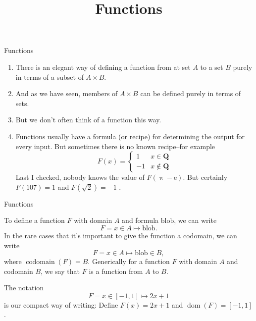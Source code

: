 \documentclass[fleqn]{beamer}
\title{\textbf{Functions}}
\date{}
\newcommand{\rationals}{\mathbf{Q}}
\DeclareMathOperator{\dom}{dom}
\DeclareMathOperator{\codomain}{codomain}
\theoremstyle{definition}
\newenvironment{checklist}{
  \begin{enumerate}[\ding{51}]
    \addtolength{\itemsep}{-0.0\itemsep}}
  {\end{enumerate}}
\begin{document}
\frame{\titlepage}


\begin{frame}{Functions}

\begin{checklist}

\item There is an elegant way of defining a function from at set \(A\) to a set \(B\)
  purely in terms of a subset of \(A \times B\).

\vspace{0.2in}

\item And as we have seen, members of \(A \times B\) can be defined purely in terms 
of sets.

\vspace{0.2in}

\item But we don't often think of a function this way.

\vspace{0.2in}

\item Functions usually have a formula (or recipe) for determining the output for 
every input. But sometimes there is no known recipe--for example
\[
    F(x) = \begin{cases}   1   & x \in \rationals \\   -1   & x \notin \rationals  \end{cases}
 \]
 Last I checked, nobody knows the value of \(F(\uppi - \mathrm{e}) \).    
 But certainly \(F(107) = 1 \) and  \(F(\sqrt{2}) = -1 \) .
     

\end{checklist}

\end{frame}

\begin{frame}{Functions}

To define a function \(F\) with domain \(A\) and formula \(\mbox{blob}\), we can 
write
\[
  F = x \in A \mapsto \mbox{blob}.
\]
In the rare cases that it's important to give the function a codomain, we can write
\[
  F = x \in A \mapsto \mbox{blob} \in B,
\]
where \(\codomain(F) = B\). Generically for a function \(F\) with domain \(A\) and 
codomain \(B\),  we say that \(F\) is a function from \(A\) to \(B\).

\begin{example} The notation
\[
   F = x \in [-1,1] \mapsto 2 x + 1
\]
is our compact way of writing: Define \(F(x) = 2x + 1 \) and \(\dom(F) = [-1,1] \).
\end{example}
\end{frame}
\end{document}
